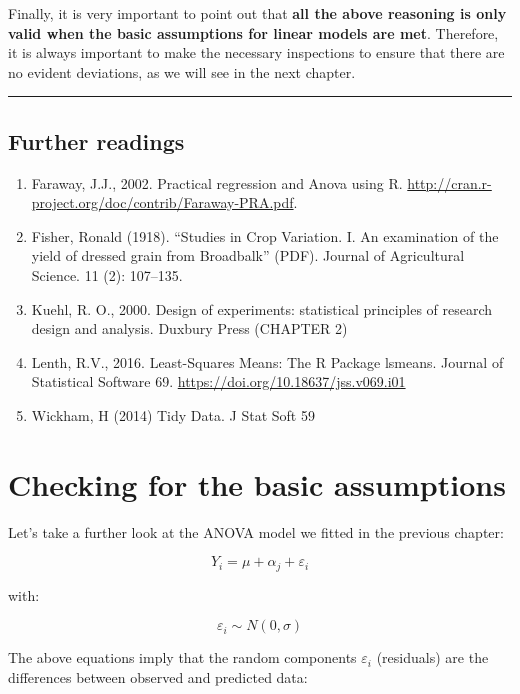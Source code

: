 \documentclass[a4paper,12pt,oneside]{book}
\providecommand{\tightlist}{%
  \setlength{\itemsep}{0pt}\setlength{\parskip}{0pt}}
\begin{document}
Finally, it is very important to point out that \textbf{all the above reasoning is only valid when the basic assumptions for linear models are met}. Therefore, it is always important to make the necessary inspections to ensure that there are no evident deviations, as we will see in the next chapter.

\begin{center}\rule{0.5\linewidth}{0.5pt}\end{center}

\hypertarget{further-readings-5}{%
\section{Further readings}\label{further-readings-5}}

\begin{enumerate}
\def\labelenumi{\arabic{enumi}.}
\tightlist
\item
  Faraway, J.J., 2002. Practical regression and Anova using R. \url{http://cran.r-project.org/doc/contrib/Faraway-PRA.pdf}.
\item
  Fisher, Ronald (1918). ``Studies in Crop Variation. I. An examination of the yield of dressed grain from Broadbalk'' (PDF). Journal of Agricultural Science. 11 (2): 107--135.
\item
  Kuehl, R. O., 2000. Design of experiments: statistical principles of research design and analysis. Duxbury Press (CHAPTER 2)
\item
  Lenth, R.V., 2016. Least-Squares Means: The R Package lsmeans. Journal of Statistical Software 69. \url{https://doi.org/10.18637/jss.v069.i01}
\item
  Wickham, H (2014) Tidy Data. J Stat Soft 59
\end{enumerate}

\hypertarget{checking-for-the-basic-assumptions}{%
\chapter{Checking for the basic assumptions}\label{checking-for-the-basic-assumptions}}

Let's take a further look at the ANOVA model we fitted in the previous chapter:

\[Y_i = \mu + \alpha_j + \varepsilon_i\]

with:

\[ \varepsilon_i \sim N(0, \sigma) \]

The above equations imply that the random components \(\varepsilon_i\) (residuals) are the differences between observed and predicted data:
\end{document}
